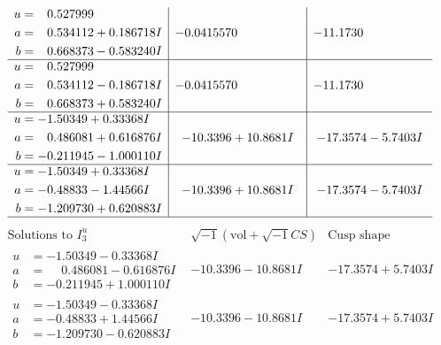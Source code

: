 \documentclass[1p]{elsarticle_modified}
\theoremstyle{definition}
\newcommand{\I}{\sqrt{-1}}
\begin{document}
$$\begin{array}{c|c|c}
\begin{aligned}
u &= \phantom{-}0.527999\phantom{ +0.000000I} \\
a &= \phantom{-}0.534112 + 0.186718 I \\
b &= \phantom{-}0.668373 - 0.583240 I\end{aligned}
 & -0.0415570\phantom{ +0.000000I} & -11.1730\phantom{ +0.000000I} \\ \hline\begin{aligned}
u &= \phantom{-}0.527999\phantom{ +0.000000I} \\
a &= \phantom{-}0.534112 - 0.186718 I \\
b &= \phantom{-}0.668373 + 0.583240 I\end{aligned}
 & -0.0415570\phantom{ +0.000000I} & -11.1730\phantom{ +0.000000I} \\ \hline\begin{aligned}
u &= -1.50349 + 0.33368 I \\
a &= \phantom{-}0.486081 + 0.616876 I \\
b &= -0.211945 - 1.000110 I\end{aligned}
 & -10.3396 + 10.8681 I & -17.3574 - 5.7403 I \\ \hline\begin{aligned}
u &= -1.50349 + 0.33368 I \\
a &= -0.48833 - 1.44566 I \\
b &= -1.209730 + 0.620883 I\end{aligned}
 & -10.3396 + 10.8681 I & -17.3574 - 5.7403 I\\
 \hline 
 \end{array}$$\newpage$$\begin{array}{c|c|c}  
\text{Solutions to }I^u_{3}& \I (\text{vol} + \sqrt{-1}CS) & \text{Cusp shape}\\
 \hline 
\begin{aligned}
u &= -1.50349 - 0.33368 I \\
a &= \phantom{-}0.486081 - 0.616876 I \\
b &= -0.211945 + 1.000110 I\end{aligned}
 & -10.3396 - 10.8681 I & -17.3574 + 5.7403 I \\ \hline\begin{aligned}
u &= -1.50349 - 0.33368 I \\
a &= -0.48833 + 1.44566 I \\
b &= -1.209730 - 0.620883 I\end{aligned}
 & -10.3396 - 10.8681 I & -17.3574 + 5.7403 I \\ \hline\begin{aligned}

\end{aligned}
\end{array}$$
\end{document}

